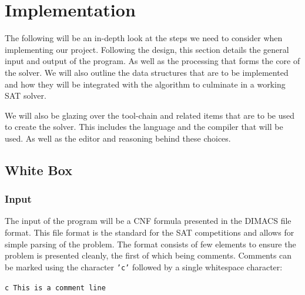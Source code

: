 \documentclass{article}
\begin{document}
\section{Implementation}

The following will be an in-depth look at the steps we need to consider when implementing our
project. Following the design, this section details the general input and output of the program. As
well as the processing that forms the core of the solver. We will also outline the data structures
that are to be implemented and how they will be integrated with the algorithm to culminate in a
working SAT solver.

We will also be glazing over the tool-chain and related items that are to be used to create the
solver. This includes the language and the compiler that will be used. As well as the editor and
reasoning behind these choices.

\subsection{White Box}

\subsubsection{Input}
The input of the program will be a CNF formula presented in the DIMACS file format. This file format
is the standard for the SAT competitions and allows for simple parsing of the problem. The format
consists of few elements to ensure the problem is presented cleanly, the first of which being
comments. Comments can be marked using the character \texttt{'c'} followed by a single whitespace
character:

\begin{center}
    \texttt{c This is a comment line}
\end{center}
\end{document}
